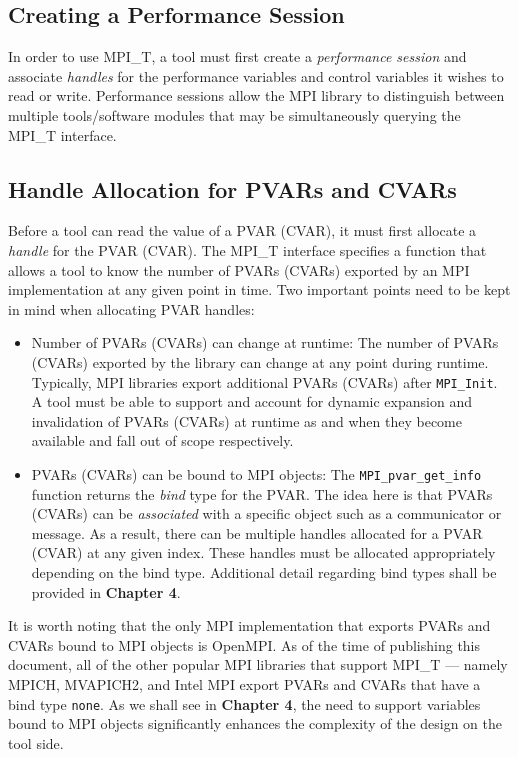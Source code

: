 \subsection{Creating a Performance Session}
In order to use MPI\_T, a tool must first create a \emph{performance session} and associate \emph{handles} for the performance variables and control variables it wishes to read or write. Performance sessions allow the MPI library to distinguish between multiple tools/software modules that may be simultaneously querying the MPI\_T interface.

\subsection{Handle Allocation for PVARs and CVARs}
Before a tool can read the value of a PVAR (CVAR), it must first allocate a \emph{handle} for the PVAR (CVAR). The MPI\_T interface specifies a function that allows a tool to know the number of PVARs (CVARs) exported by an MPI implementation at any given point in time. Two important points need to be kept in mind when allocating PVAR handles:
\begin{itemize}
	\item Number of PVARs (CVARs) can change at runtime: The number of PVARs (CVARs) exported by the library can change at any point during runtime. Typically, MPI libraries export additional PVARs (CVARs) after \verb+MPI_Init+. A tool must be able to support and account for dynamic expansion and invalidation of PVARs (CVARs) at runtime as and when they become available and fall out of scope respectively.
	\item PVARs (CVARs) can be bound to MPI objects: The \verb+MPI_pvar_get_info+ function returns the \emph{bind} type for the PVAR. The idea here is that PVARs (CVARs) can be \emph{associated} with a specific object such as a communicator or message. As a result, there can be multiple handles allocated for a PVAR (CVAR) at any given index. These handles must be allocated appropriately depending on the bind type. Additional detail regarding bind types shall be provided in \textbf{Chapter 4}.
\end{itemize}

\par It is worth noting that the only MPI implementation that exports PVARs and CVARs bound to MPI objects is OpenMPI. As of the time of publishing this document, all of the other popular MPI libraries that support MPI\_T --- namely MPICH, MVAPICH2, and Intel MPI export PVARs and CVARs that have a bind type \verb+none+. As we shall see in \textbf{Chapter 4}, the need to support variables bound to MPI objects significantly enhances the complexity of the design on the tool side.

